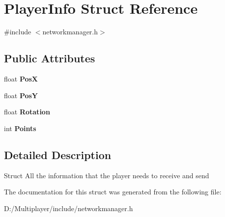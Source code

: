 \hypertarget{struct_player_info}{}\section{Player\+Info Struct Reference}
\label{struct_player_info}


{\ttfamily \#include $<$networkmanager.\+h$>$}

\subsection*{Public Attributes}
\begin{DoxyCompactItemize}
\item 
\mbox{\label{struct_player_info_a1a7b2407a8c8e565179951a8e0967017}} 
float {\bfseries PosX}
\item 
\mbox{\label{struct_player_info_a378eed19a95ececc667970d7a14b8f31}} 
float {\bfseries PosY}
\item 
\mbox{\label{struct_player_info_ab04486c35400ab0dadfcea6bda8dd033}} 
float {\bfseries Rotation}
\item 
\mbox{\label{struct_player_info_a0499cbd42d40f45a0e1ae1652bf9b69f}} 
int {\bfseries Points}
\end{DoxyCompactItemize}


\subsection{Detailed Description}
Struct All the information that the player needs to receive and send 

The documentation for this struct was generated from the following file\+:\begin{DoxyCompactItemize}
\item 
D\+:/\+Multiplayer/include/networkmanager.\+h\end{DoxyCompactItemize}

